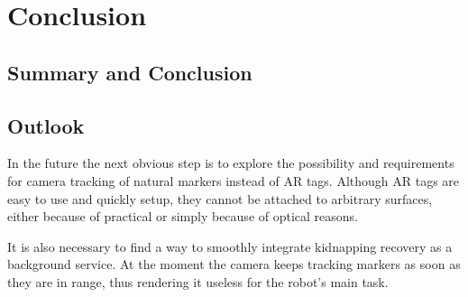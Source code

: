 \chapter{Conclusion}
\section{Summary and Conclusion}
\section{Outlook}
In the future the next obvious step is to explore the possibility and requirements for camera tracking of natural markers instead of AR tags. Although AR tags are easy to use and quickly setup, they cannot be attached to arbitrary surfaces, either because of practical or simply because of optical reasons.

It is also necessary to find a way to smoothly integrate kidnapping recovery as a background service. At the moment the camera keeps tracking markers as soon as they are in range, thus rendering it useless for the robot's main task.